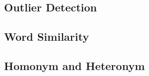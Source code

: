 

\subsection{Outlier Detection} \label{sec:analysis_outlier}











\subsection{Word Similarity} \label{sec:analysis_similarity}




\subsection{Homonym and Heteronym} \label{sec:analysis_homonym_heteronym}





